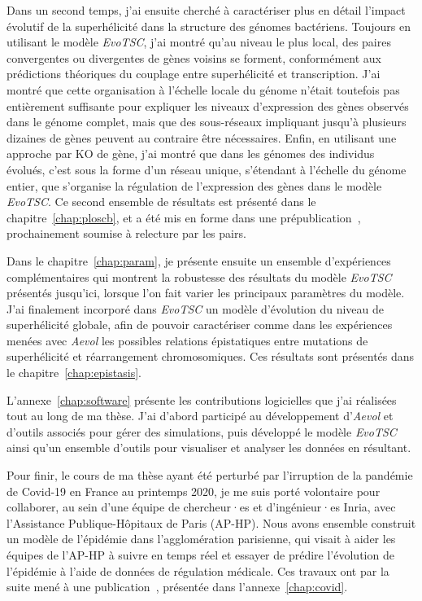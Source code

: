 Dans un second temps, j'ai ensuite cherché à caractériser plus en détail l'impact évolutif de la superhélicité dans la structure des génomes bactériens.
Toujours en utilisant le modèle \emph{EvoTSC}, j'ai montré qu'au niveau le plus local, des paires convergentes ou divergentes de gènes voisins se forment, conformément aux prédictions théoriques du couplage entre superhélicité et transcription.
J'ai montré que cette organisation à l'échelle locale du génome n'était toutefois pas entièrement suffisante pour expliquer les niveaux d'expression des gènes observés dans le génome complet, mais que des sous-réseaux impliquant jusqu'à plusieurs dizaines de gènes peuvent au contraire être nécessaires.
Enfin, en utilisant une approche par KO de gène, j'ai montré que dans les génomes des individus évolués, c'est sous la forme d'un réseau unique, s'étendant à l'échelle du génome entier, que s'organise la régulation de l'expression des gènes dans le modèle \emph{EvoTSC}.
Ce second ensemble de résultats est présenté dans le chapitre~\ref{chap:ploscb}, et a été mis en forme dans une prépublication~\citep{grohens2022b}, prochainement soumise à relecture par les pairs.

Dans le chapitre~\ref{chap:param}, je présente ensuite un ensemble d'expériences complémentaires qui montrent la robustesse des résultats du modèle \emph{EvoTSC} présentés jusqu'ici, lorsque l'on fait varier les principaux paramètres du modèle.
J'ai finalement incorporé dans \emph{EvoTSC} un modèle d'évolution du niveau de superhélicité globale, afin de pouvoir caractériser comme dans les expériences menées avec \emph{Aevol} les possibles relations épistatiques entre mutations de superhélicité et réarrangement chromosomiques.
Ces résultats sont présentés dans le chapitre~\ref{chap:epistasis}.

L'annexe~\ref{chap:software} présente les contributions logicielles que j'ai réalisées tout au long de ma thèse.
J'ai d'abord participé au développement d'\emph{Aevol} et d'outils associés pour gérer des simulations, puis développé le modèle \emph{EvoTSC} ainsi qu'un ensemble d'outils pour visualiser et analyser les données en résultant.

Pour finir, le cours de ma thèse ayant été perturbé par l'irruption de la pandémie de Covid-19 en France au printemps 2020, je me suis porté volontaire pour collaborer, au sein d'une équipe de chercheur·es et d'ingénieur·es Inria, avec l'Assistance Publique-Hôpitaux de Paris (AP-HP).
Nous avons ensemble construit un modèle de l'épidémie dans l'agglomération parisienne, qui visait à aider les équipes de l'AP-HP à suivre en temps réel et essayer de prédire l'évolution de l'épidémie à l'aide de données de régulation médicale.
Ces travaux ont par la suite mené à une publication~\citep{gaubert2020}, présentée dans l'annexe~\ref{chap:covid}.

